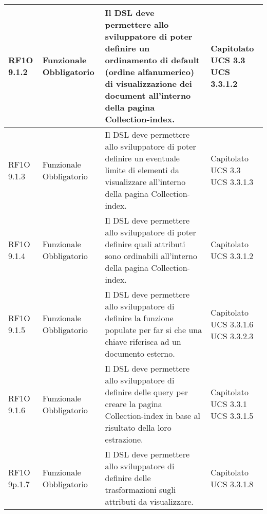 \begin{center}
\begin{longtable}{ | l | p{2cm} | p{5cm} | p{1.7cm} |}
				RF1O 9.1.2 & Funzionale \newline  Obbligatorio  & Il DSL deve permettere allo sviluppatore di poter definire un ordinamento di default (ordine alfanumerico) di visualizzazione dei document all'interno della pagina Collection-index. &  Capitolato \newline  UCS 3.3 \newline  UCS 3.3.1.2 \newline  \\ \hline      
				RF1O 9.1.3 & Funzionale \newline  Obbligatorio  & Il DSL deve permettere allo sviluppatore di poter definire un eventuale limite di elementi da visualizzare all’interno della pagina Collection-index. &  Capitolato \newline  UCS 3.3 \newline  UCS 3.3.1.3 \newline  \\ \hline      
				RF1O 9.1.4 & Funzionale \newline  Obbligatorio  & Il DSL deve permettere allo sviluppatore di poter definire quali attributi sono ordinabili all’interno della pagina Collection-index. &  Capitolato \newline  UCS 3.3.1.2 \newline  \\ \hline      
				RF1O 9.1.5 & Funzionale \newline  Obbligatorio  & Il DSL deve permettere allo sviluppatore di definire la funzione populate per far si che una chiave riferisca ad un documento esterno. &  Capitolato \newline  UCS 3.3.1.6 \newline  UCS 3.3.2.3 \newline  \\ \hline      
				RF1O 9.1.6 & Funzionale \newline  Obbligatorio  & Il DSL deve permettere allo sviluppatore di definire delle query per creare la pagina Collection-index in base al risultato della loro estrazione. &  Capitolato \newline  UCS 3.3.1 \newline  UCS 3.3.1.5 \newline  \\ \hline      
				RF1O 9p.1.7 & Funzionale \newline  Obbligatorio  & Il DSL deve permettere allo sviluppatore di definire delle trasformazioni sugli attributi da visualizzare. &  Capitolato \newline  UCS 3.3.1.8 \newline  \\ \hline      

\end{longtable}
\end{center}
